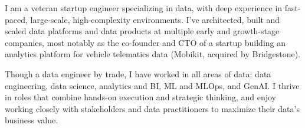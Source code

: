 

\begin{cvparagraph}


I am a veteran startup engineer specializing in data, with deep experience in fast-paced, large-scale, high-complexity environments. I've architected, built and scaled data platforms and data products at multiple early and growth-stage companies, most notably as the co-founder and CTO of a startup building an analytics platform for vehicle telematics data (Mobikit, acquired by Bridgestone).

Though a data engineer by trade, I have worked in all areas of data: data engineering, data science, analytics and BI, ML and MLOps, and GenAI. I thrive in roles that combine hands-on execution and strategic thinking, and enjoy working closely with stakeholders and data practitioners to maximize their data's business value.

\end{cvparagraph}
